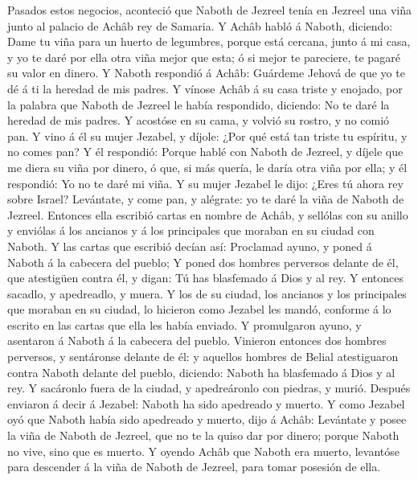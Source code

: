  Pasados estos negocios, aconteció que Naboth de Jezreel
tenía en Jezreel una viña junto al palacio de Achâb rey de Samaria.
 Y Achâb habló á Naboth, diciendo: Dame tu viña para un
huerto de legumbres, porque está cercana, junto á mi casa, y yo te daré
por ella otra viña mejor que esta; ó si mejor te pareciere, te pagaré su
valor en dinero.  Y Naboth respondió á Achâb: Guárdeme
Jehová de que yo te dé á ti la heredad de mis padres.  Y
vínose Achâb á su casa triste y enojado, por la palabra que Naboth de
Jezreel le había respondido, diciendo: No te daré la heredad de mis
padres. Y acostóse en su cama, y volvió su rostro, y no comió pan.
 Y vino á él su mujer Jezabel, y díjole: ¿Por qué está tan
triste tu espíritu, y no comes pan?  Y él respondió:
Porque hablé con Naboth de Jezreel, y díjele que me diera su viña por
dinero, ó que, si más quería, le daría otra viña por ella; y él
respondió: Yo no te daré mi viña.  Y su mujer Jezabel le
dijo: ¿Eres tú ahora rey sobre Israel? Levántate, y come pan, y
alégrate: yo te daré la viña de Naboth de Jezreel. 
Entonces ella escribió cartas en nombre de Achâb, y sellólas con su
anillo y enviólas á los ancianos y á los principales que moraban en su
ciudad con Naboth.  Y las cartas que escribió decían así:
Proclamad ayuno, y poned á Naboth á la cabecera del pueblo;
 Y poned dos hombres perversos delante de él, que
atestigüen contra él, y digan: Tú has blasfemado á Dios y al rey. Y
entonces sacadlo, y apedreadlo, y muera.  Y los de su
ciudad, los ancianos y los principales que moraban en su ciudad, lo
hicieron como Jezabel les mandó, conforme á lo escrito en las cartas que
ella les había enviado.  Y promulgaron ayuno, y asentaron
á Naboth á la cabecera del pueblo.  Vinieron entonces dos
hombres perversos, y sentáronse delante de él: y aquellos hombres de
Belial atestiguaron contra Naboth delante del pueblo, diciendo: Naboth
ha blasfemado á Dios y al rey. Y sacáronlo fuera de la ciudad, y
apedreáronlo con piedras, y murió.  Después enviaron á
decir á Jezabel: Naboth ha sido apedreado y muerto.  Y
como Jezabel oyó que Naboth había sido apedreado y muerto, dijo á Achâb:
Levántate y posee la viña de Naboth de Jezreel, que no te la quiso dar
por dinero; porque Naboth no vive, sino que es muerto.  Y
oyendo Achâb que Naboth era muerto, levantóse para descender á la viña
de Naboth de Jezreel, para tomar posesión de ella. 
